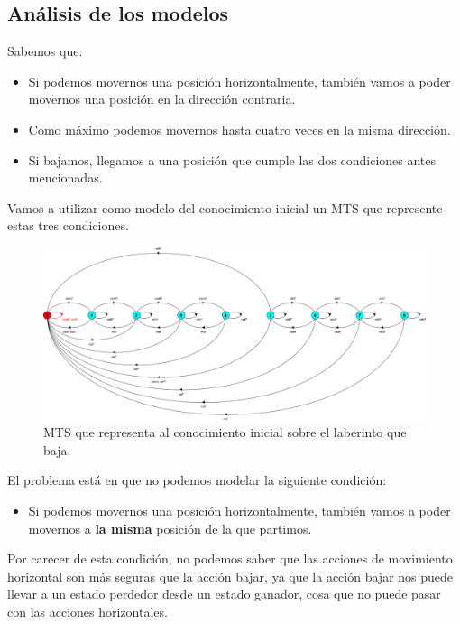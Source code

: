 \clearpage

\subsection{Análisis de los modelos}

Sabemos que:
\begin{itemize}

\item
Si podemos movernos una posición horizontalmente, también vamos a poder movernos una posición en la dirección contraria.

\item
Como máximo podemos movernos hasta cuatro veces en la misma dirección.

\item
Si bajamos, llegamos a una posición que cumple las dos condiciones antes mencionadas.

\end{itemize}

Vamos a utilizar como modelo del conocimiento inicial un MTS que represente estas tres condiciones.

\begin{figure}[H]
	\centering
		\includegraphics[width=1.0\textwidth]{Imagenes/Laberintos/down_modelo.png}
	\caption{MTS que representa al conocimiento inicial sobre el laberinto que baja.}
	\label{fig:down_modelo}
\end{figure}

El problema está en que no podemos modelar la siguiente condición:
\begin{itemize}
\item
Si podemos movernos una posición horizontalmente, también vamos a poder movernos a \textbf{la misma} posición de la que partimos.
\end{itemize}

Por carecer de esta condición, no podemos saber que las acciones de movimiento horizontal son más seguras que la acción bajar, 
ya que la acción bajar nos puede llevar a un estado perdedor desde un estado ganador, cosa que no puede pasar con las acciones horizontales.

